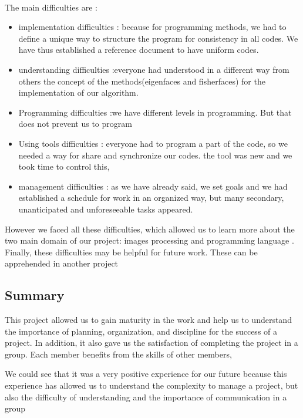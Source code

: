 \paragraph{} 
The main difficulties are :
\begin{itemize}
\item implementation difficulties : because for programming methods, we had to define a unique way to structure the program for consistency in all codes. We have thus established a reference document to have uniform codes.
\item understanding difficulties :everyone had understood in a different way from others  the concept of the methods(eigenfaces and fisherfaces) for the implementation of our algorithm. 
\item Programming difficulties :we have different levels in programming. But that does not prevent us to program
\item Using tools  difficulties : everyone had to program a part of the code, so we needed a way for share and  synchronize our codes. the tool was new and we took time to control this,
\item management difficulties : as we have already said, we set goals and we had established a schedule for work in an organized way, but many secondary, unanticipated and unforeseeable tasks appeared.
\end{itemize}

However we faced all these difficulties, which allowed us to learn more about the two main domain of our project: images processing and programming language .
Finally, these difficulties may be helpful for future work. These can be apprehended in another project


\subsection{Summary}

This project allowed us to gain maturity in the work and help us  to understand the importance of planning, organization, and discipline for the success of a project. In addition, it also gave us the satisfaction of completing the project in a group. Each member benefits from the skills of other members,

We could see that it was a very positive experience for our future because this experience has allowed us to understand the complexity to manage a project, but also the difficulty of understanding and the importance of communication in a group


